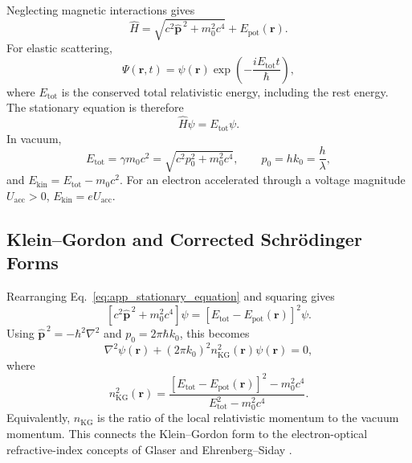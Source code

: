 Neglecting magnetic interactions gives
\begin{equation}
\hat H
=
\sqrt{c^2\hat{\mathbf p}^{\,2}+m_0^2c^4}
+
E_{\mathrm{pot}}(\mathbf r).
\label{eq:app_relativistic_hamiltonian}
\end{equation}
For elastic scattering,
\begin{equation}
\Psi(\mathbf r,t)
=
\psi(\mathbf r)
\exp\left(-\frac{iE_{\mathrm{tot}}t}{\hbar}\right),
\label{eq:app_stationary_ansatz}
\end{equation}
where $E_{\mathrm{tot}}$ is the conserved total relativistic energy, including
the rest energy. The stationary equation is therefore
\begin{equation}
\hat H\psi=E_{\mathrm{tot}}\psi.
\label{eq:app_stationary_equation}
\end{equation}
In vacuum,
\begin{equation}
E_{\mathrm{tot}}
=
\gamma m_0c^2
=
\sqrt{c^2p_0^2+m_0^2c^4},
\qquad
p_0=hk_0=\frac{h}{\lambda},
\label{eq:app_vacuum_energy_momentum}
\end{equation}
and $E_{\mathrm{kin}}=E_{\mathrm{tot}}-m_0c^2$. For an electron accelerated
through a voltage magnitude $U_{\mathrm{acc}}>0$,
$E_{\mathrm{kin}}=eU_{\mathrm{acc}}$.

\subsection{Klein--Gordon and Corrected Schr\"odinger Forms}

Rearranging Eq.~\eqref{eq:app_stationary_equation} and squaring gives
\begin{equation}
\left[c^2\hat{\mathbf p}^{\,2}+m_0^2c^4\right]\psi
=
\left[E_{\mathrm{tot}}-E_{\mathrm{pot}}(\mathbf r)\right]^2\psi .
\label{eq:app_kg_before_linearisation}
\end{equation}
Using $\hat{\mathbf p}^{\,2}=-\hbar^2\nabla^2$ and
$p_0=2\pi\hbar k_0$, this becomes
\begin{equation}
\nabla^2\psi(\mathbf r)
+
(2\pi k_0)^2n_{\mathrm{KG}}^2(\mathbf r)\psi(\mathbf r)
=0,
\label{eq:app_kg_helmholtz_form}
\end{equation}
where
\begin{equation}
n_{\mathrm{KG}}^2(\mathbf r)
=
\frac{
\left[E_{\mathrm{tot}}-E_{\mathrm{pot}}(\mathbf r)\right]^2-m_0^2c^4
}{
E_{\mathrm{tot}}^2-m_0^2c^4
}.
\label{eq:app_kg_refractive_index}
\end{equation}
Equivalently, $n_{\mathrm{KG}}$ is the ratio of the local relativistic
momentum to the vacuum momentum. This connects the Klein--Gordon form to the
electron-optical refractive-index concepts of Glaser and Ehrenberg--Siday
\cite{Glaser1933,Ehrenberg-Siday1949}.

